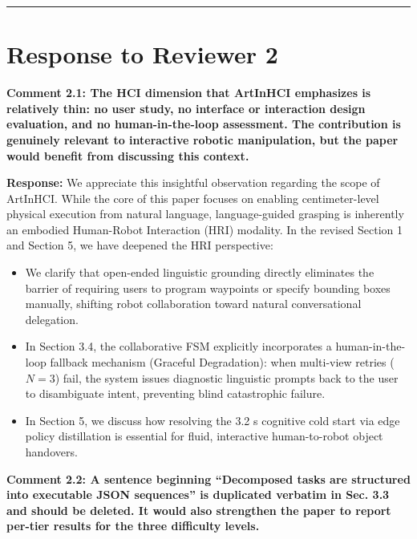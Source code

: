 \documentclass[11pt]{article}
\newcommand{\reviewercomment}[1]{\vspace{1.8ex}\noindent\textbf{\textcolor{revcolor}{#1}}}
\newcommand{\response}{\vspace{1ex}\noindent\textbf{Response: }}
\begin{document}
\vspace{3ex}
\hrule
\vspace{2ex}

\section*{Response to Reviewer 2}

\reviewercomment{Comment 2.1: The HCI dimension that ArtInHCI emphasizes is relatively thin: no user study, no interface or interaction design evaluation, and no human-in-the-loop assessment. The contribution is genuinely relevant to interactive robotic manipulation, but the paper would benefit from discussing this context.}

\response
We appreciate this insightful observation regarding the scope of ArtInHCI. While the core of this paper focuses on enabling centimeter-level physical execution from natural language, language-guided grasping is inherently an embodied Human-Robot Interaction (HRI) modality. In the revised Section 1 and Section 5, we have deepened the HRI perspective:
\begin{itemize}[leftmargin=*]
    \item We clarify that open-ended linguistic grounding directly eliminates the barrier of requiring users to program waypoints or specify bounding boxes manually, shifting robot collaboration toward natural conversational delegation.
    \item In Section 3.4, the collaborative FSM explicitly incorporates a human-in-the-loop fallback mechanism (Graceful Degradation): when multi-view retries ($N=3$) fail, the system issues diagnostic linguistic prompts back to the user to disambiguate intent, preventing blind catastrophic failure.
    \item In Section 5, we discuss how resolving the 3.2 s cognitive cold start via edge policy distillation is essential for fluid, interactive human-to-robot object handovers.
\end{itemize}

\reviewercomment{Comment 2.2: A sentence beginning ``Decomposed tasks are structured into executable JSON sequences'' is duplicated verbatim in Sec. 3.3 and should be deleted. It would also strengthen the paper to report per-tier results for the three difficulty levels.}
\end{document}
